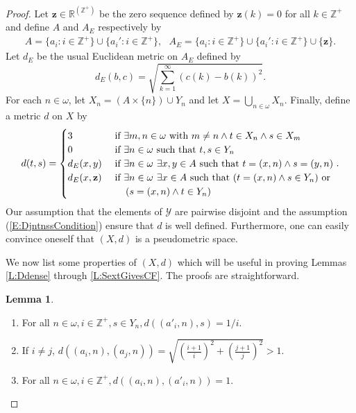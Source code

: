 \documentclass[11pt, reqno]{amsart}
\theoremstyle{definition}
\numberwithin{theorem}{section}
\theoremstyle{definition}
\theoremstyle{definition}
\newtheorem{lemma}[theorem]{Lemma}
\theoremstyle{definition}
\theoremstyle{definition}
\theoremstyle{definition}
\numberwithin{claim}{section}
\theoremstyle{definition}
\theoremstyle{definition}
\theoremstyle{definition}
\theoremstyle{definition}
\theoremstyle{definition}
\theoremstyle{remboldstyle}
\begin{document}
\begin{proof}
Let $\mathbf{z} \in \mathbb{R}^{(\mathbb{Z}^+)}$ be the zero sequence defined by $\mathbf{z}(k) = 0$ for all $k \in \mathbb{Z}^+$ and define $A$ and $A_E$ respectively by
\begin{align*}
A = \{ a_i : i \in \mathbb{Z}^+ \} \cup \{ a_i' : i \in \mathbb{Z}^+ \}, \,\,\,\,
A_E = \{ a_i : i \in \mathbb{Z}^+ \} \cup \{ a_i' : i \in \mathbb{Z}^+ \} \cup \{ \mathbf{z} \}.
\end{align*}
Let $d_E$ be the usual Euclidean metric on $A_E$ defined by 
\[
d_E(b,c) = \sqrt{\sum_{k=1}^\infty (c(k)-b(k))^2}.
\]
For each $n \in \omega$, let $X_n = (A \times \{ n \}) \cup Y_n$ and let $X = \bigcup_{n \in \omega} X_n$. Finally, define a metric $d$ on $X$ by 
\[
d(t,s) = \begin{cases} 3 & \mbox{ if } \exists m,n \in \omega \mbox{ with } m \ne n \land  t \in X_n \land s \in X_m \\
                       0 & \mbox{ if } \exists n \in \omega \mbox{ such that }t,s \in Y_n \\
                       d_E(x,y) & \mbox{ if } \exists n \in \omega \hskip.05in \exists x, y \in A \mbox{ such that } t = (x,n) \land s = (y,n) \\
                       d_E(x,\mathbf{z}) & \mbox{ if } \exists n \in \omega \hskip.05in \exists x \in A \mbox{ such that } (t= (x,n) \land s \in Y_n ) \mbox{ or }\\
                       & \hskip.2in(s = (x,n) \land t \in Y_n)
         \end{cases}.
\]
Our assumption that the elements of $\mathcal{Y}$ are pairwise disjoint and the assumption (\ref{E:DjntnssCondition}) ensure that $d$ is well defined.
Furthermore, one can easily convince oneself that  $(X,d)$ is a pseudometric space. 
\par
We now list some properties of $(X,d)$ which will be useful in proving Lemmas \ref{L:Ddense} through \ref{L:SextGivesCF}. The proofs are straightforward.
\begin{lemma}\label{L:propsOfXd}
$\,$
\begin{enumerate}
\item \label{LI:da'ins}  For all $n \in \omega,  i \in \mathbb{Z}^+,  s \in Y_n, d((a'_i,n),s) = 1/i$. %
\item  \label{LI:daiaj>1} If $i \ne j$, $d((a_i,n),(a_j,n)) = \sqrt{\left( \frac{i+1}{i}\right)^2 + \left(\frac{j+1}{j}\right)^2} > 1$. %
\item \label{LI:daia'i=1} For all $ n \in \omega,  i \in \mathbb{Z}^+, d((a_i,n),(a'_i,n)) = 1$. %

\end{enumerate}
\end{lemma}
\end{proof}
\end{document}
